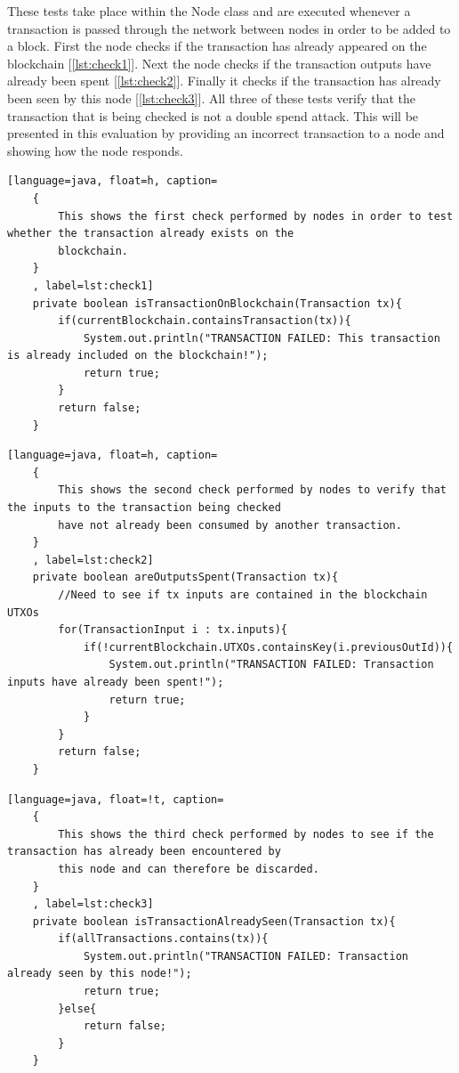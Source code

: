 \documentclass{l4proj}
\begin{document}
These tests take place within the Node class and are executed whenever a transaction is passed through the network
between nodes in order to be added to a block. First the node checks if the transaction has already appeared on the
blockchain [\ref{lst:check1}]. Next the node checks if the transaction outputs have already been spent [\ref{lst:check2}]. 
Finally it checks if the transaction has already been seen by this node [\ref{lst:check3}]. All three of these tests 
verify that the transaction that is being checked is not a double spend attack. This will be presented in this 
evaluation by providing an incorrect transaction to a node and showing how the node responds.

\begin{lstlisting}[language=java, float=h, caption=
    {
        This shows the first check performed by nodes in order to test whether the transaction already exists on the
        blockchain.
    }
    , label=lst:check1]
    private boolean isTransactionOnBlockchain(Transaction tx){
        if(currentBlockchain.containsTransaction(tx)){
            System.out.println("TRANSACTION FAILED: This transaction is already included on the blockchain!");
            return true;
        }
        return false;
    }
\end{lstlisting}

\begin{lstlisting}[language=java, float=h, caption=
    {
        This shows the second check performed by nodes to verify that the inputs to the transaction being checked
        have not already been consumed by another transaction.
    }
    , label=lst:check2]
    private boolean areOutputsSpent(Transaction tx){
        //Need to see if tx inputs are contained in the blockchain UTXOs
        for(TransactionInput i : tx.inputs){
            if(!currentBlockchain.UTXOs.containsKey(i.previousOutId)){
                System.out.println("TRANSACTION FAILED: Transaction inputs have already been spent!");
                return true;
            }
        }
        return false;
    }
\end{lstlisting}

\begin{lstlisting}[language=java, float=!t, caption=
    {
        This shows the third check performed by nodes to see if the transaction has already been encountered by
        this node and can therefore be discarded.
    }
    , label=lst:check3]
    private boolean isTransactionAlreadySeen(Transaction tx){
        if(allTransactions.contains(tx)){
            System.out.println("TRANSACTION FAILED: Transaction already seen by this node!");
            return true;
        }else{
            return false;
        }
    }
\end{lstlisting}
\end{document}
